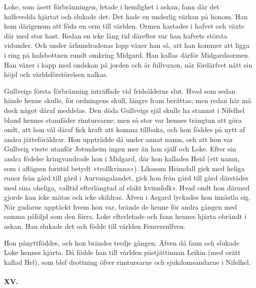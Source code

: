 Loke, som åsett förbränningen, letade i hemlighet i askan, fann där det
halfsvedda hjärtat och slukade det. Det hade en underlig värkan på
honom. Han kom därigenom att föda en orm till världen. Ormen kastades i
hafvet och växte där med stor hast. Redan en icke lång tid därefter var
han hafvets största vidunder. Och under århundradenas lopp växer han så,
att han kommer att ligga i ring på hafsbottnen rundt omkring Midgard.
Han kallas därför Midgardsormen. Han växer i kapp med ondskan på jorden
och är fullvuxen, när fördärfvet nått sin höjd och världsförstörelsen
nalkas.

Gullveigs första förbränning inträffade vid fridsålderns slut. Hvad som
sedan hände henne skulle, för ordningens skull, längre fram berättas;
men redan här må dock något däraf meddelas. Den döda Gullveigs själ
skulle ha stannat i Nifelhel bland hennes stamfäder rimtursarne; men så
stor var hennes trängtan att göra ondt, att hon väl däraf fick kraft att
komma tillbaka, och hon föddes på nytt af andra jätteföräldrar. Hon
uppträdde då under annat namn, och att hon var Gullveig visste utanför
Jotunheim ingen mer än hon själf och Loke. Efter sin andra födelse
kringvandrade hon i Midgard, där hon kallades Heid (ett namn, som i
aflägsen forntid betydt »trollkvinna»). Likasom Heimdall gick med heliga
runor från gård till gård i Aurvangalandet, gick hon från gård till gård
därstädes med sina oheliga, »alltid efterlängtad af elakt
kvinnfolk\protect\hypertarget{lb1625905.xhtmlux5cux23start40}{}{}\protect\hypertarget{lb1625905.xhtmlux5cux23start40-a}{}{}\protect\hypertarget{lb1625905.xhtmlux5cux23start40-b}{}{}\protect\hypertarget{lb1625905.xhtmlux5cux23start40-c}{}{}\protect\hypertarget{lb1625905.xhtmlux5cux23start40-d}{}{}».
Hvad ondt hon därmed gjorde kan icke mätas och icke skildras. Äfven i
Asgard lyckades hon innästla sig. När gudarne upptäckt hvem hon var,
brände de henne för andra gången med samma påföljd som den förra. Loke
efterletade och fann hennes hjärta obrändt i askan. Han slukade det och
födde till världen Fenrersulfven.

Hon pånyttföddes, och hon brändes tredje gången. Äfven då fann och
slukade Loke hennes hjärta. Då födde han till världen pästjättinnan
Leikin (med orätt kallad Hel), som blef drottning öfver rimtursarne och
sjukdomsandarne i Nifelhel.

\paragraph{XV.}

